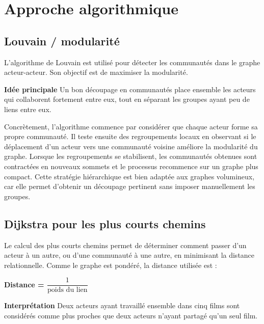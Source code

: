 \documentclass[a4paper,12pt]{article}
\begin{document}
\section{Approche algorithmique}

\subsection{Louvain / modularité}

L'algorithme de Louvain est utilisé pour détecter les communautés dans le graphe acteur-acteur. Son objectif est de maximiser la modularité.

\begin{tcolorbox}[infobox]
\textbf{Idée principale}
Un bon découpage en communautés place ensemble les acteurs qui collaborent fortement entre eux, tout en séparant les groupes ayant peu de liens entre eux.
\end{tcolorbox}

Concrètement, l'algorithme commence par considérer que chaque acteur forme sa propre communauté. Il teste ensuite des regroupements locaux en observant si le déplacement d'un acteur vers une communauté voisine améliore la modularité du graphe. Lorsque les regroupements se stabilisent, les communautés obtenues sont contractées en nouveaux sommets et le processus recommence sur un graphe plus compact. Cette stratégie hiérarchique est bien adaptée aux graphes volumineux, car elle permet d'obtenir un découpage pertinent sans imposer manuellement les groupes.

\subsection{Dijkstra pour les plus courts chemins}

Le calcul des plus courts chemins permet de déterminer comment passer d'un acteur à un autre, ou d'une communauté à une autre, en minimisant la distance relationnelle. Comme le graphe est pondéré, la distance utilisée est :

\begin{center}
\Large\bfseries\color{maincolor}
Distance = $\dfrac{1}{\text{poids du lien}}$
\end{center}

\begin{tcolorbox}[greenbox]
\textbf{Interprétation}
Deux acteurs ayant travaillé ensemble dans cinq films sont considérés comme plus proches que deux acteurs n'ayant partagé qu'un seul film.
\end{tcolorbox}
\end{document}
